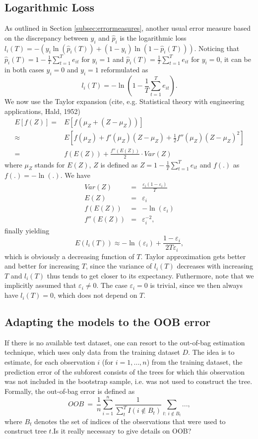 \documentclass[paper=a4
               ,12pt
               ,DIV=12
               ,parskip=half
               ,titlepage=on
               ,headinclude 
               ,footinclude
               ,headsepline
               ,footsepline         %
               ,ilines 
               ]{scrartcl}
\begin{document}
\subsection{Logarithmic Loss}
As outlined in Section \ref{subsec:errormeasures}, another usual error measure based on the discrepancy between $y_i$ and $\hat{p}_i$ is the logarithmic loss $l_i(T)=-(y_i\ln (\hat{p}_i(T))+(1-y_i)\ln (1-\hat{p}_i(T)))$. 
Noticing that $\hat{p}_i(T)=1-\frac{1}{T}\sum_{t=1}^Te_{it}$ for $y_i=1$ and $\hat{p}_i(T)=\frac{1}{T}\sum_{t=1}^Te_{it}$ for $y_i=0$, it can be in both cases $y_i=0$ and $y_i=1$ reformulated as
\[
l_i(T) =  -\ln \left( 1-\frac{1}{T}\sum_{t=1}^T e_{it} \right).
\]
We now use the Taylor expansion  (cite, e.g. Statistical theory with engineering applications, Hald, 1952)
\begin{align}
E\left[f(Z)\right]  {} = & E\left[f(\mu_Z + \left(Z - \mu_Z\right))\right] \nonumber \\
\approx & E \left[f(\mu_Z) + f'(\mu_Z)\left(Z-\mu_Z\right) + \frac{1}{2}f''(\mu_Z) \left(Z - \mu_Z\right)^2 \right] \nonumber \\
 = & f(E(Z)) + \frac{f''(E(Z))}{2} \cdot Var(Z) \nonumber
\end{align}
where $\mu_Z$ stands for $E(Z)$, $Z$ is defined as $Z=1-\frac{1}{T}\sum_{t=1}^T e_{it}$ and $f(.)$ as $f(.)=-\ln (.)$.
We have
\begin{eqnarray}
Var(Z) & = & \frac{\varepsilon_i(1-\varepsilon_i)}{T}\\
E(Z) & = & \varepsilon_i \\
f(E(Z)) & = & -\ln(\varepsilon_i) \\
f''(E(Z)) & = & \varepsilon_i^{-2},
\end{eqnarray}
finally yielding
\[
E(l_i(T)) \approx  -\ln (\varepsilon_i)+\frac{1-\varepsilon_i}{2T\varepsilon_i},
\]
which is obviously a decreasing function of $T$. Taylor approximation gets better and better for increasing $T$, since the variance of $l_i(T)$ decreases with increasing $T$ and $l_i(T)$ thus tends to get closer to its expectancy. Futhermore, note that we implicitly assumed that $\varepsilon_i\neq 0$. The case $\varepsilon_i=0$ is trivial, since we then always have $l_i(T)=0$, which does not depend on $T$.

\subsection{Adapting the models to the OOB error}
If there is no available test dataset, one can resort to the out-of-bag estimation technique, which uses only data from the training dataset $D$. The idea is to estimate, for each observation $i$ (for $i=1,\dots,n$) from the training dataset, the prediction error of the subforest consists of the trees for which this observation was not included in the bootstrap sample, i.e. was not used to construct the tree. Formally, the out-of-bag error is defined as
\[
OOB\ =\ \frac{1}{n}\sum_{i=1}^n\frac{1}{\sum_{t}^TI(i\notin B_t)}\sum_{t:\ i\notin B_t}...,
\]
where $B_t$ denotes the set of indices of the observations that were used to construct tree $t$.Is it really necessary to give details on OOB?
\end{document}
